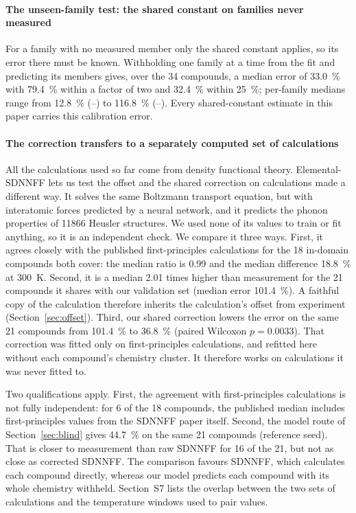 \paragraph{The unseen-family test: the shared constant on families never measured}
\label{sec:unseenfamily}
For a family with no measured member only the shared constant applies, so its error there must be
known. Withholding one family at a time from the fit and predicting its members gives, over the
\num{34} compounds, a median error of \SI{33.0}{\percent} with \SI{79.4}{\percent} within a factor
of two and \SI{32.4}{\percent} within \SI{25}{\percent}; per-family medians range from
\SI{12.8}{\percent} (--) to \SI{116.8}{\percent} (--). Every
shared-constant estimate in this paper carries this calibration error.

\paragraph{The correction transfers to a separately computed set of calculations}
\label{sec:sdnnff}

All the calculations used so far come from density functional theory. Elemental-SDNNFF
\cite{rodriguez2023millionsca} lets us test the offset and the shared correction on
calculations made a different way. It
solves the same Boltzmann transport equation, but with interatomic forces predicted by a neural
network, and it predicts the phonon properties of \num{11866} Heusler structures. We used none of its
values to train or fit anything, so it is an independent check. We compare it three ways. First, it
agrees closely with the published first-principles calculations for the \num{18} in-domain compounds
both cover: the median ratio is \num{0.99} and the median difference \SI{18.8}{\percent} at
\SI{300}{\kelvin}. Second, it is a median \num{2.01} times higher than measurement for the \num{21}
compounds it shares with our validation set (median error \SI{101.4}{\percent}). A faithful copy of
the calculation therefore inherits the calculation's offset from experiment
(Section~\ref{sec:offset}). Third, our shared correction lowers the error on the same \num{21}
compounds from \SI{101.4}{\percent} to \SI{36.8}{\percent} (paired Wilcoxon $p=\num{0.0033}$). That
correction was fitted only on first-principles calculations, and refitted here without each
compound's chemistry cluster. It therefore works on calculations it was never fitted to.

Two qualifications apply. First, the agreement with first-principles calculations is not fully
independent: for \num{6} of the \num{18} compounds, the published median includes first-principles
values from the SDNNFF paper itself. Second, the model route of Section~\ref{sec:blind} gives
\SI{44.7}{\percent} on the same \num{21} compounds (reference seed). That is closer to measurement
than raw SDNNFF for \num{16} of the \num{21}, but not as close as corrected SDNNFF. The comparison
favours SDNNFF, which calculates each compound directly, whereas our model predicts each compound
with its whole chemistry withheld. Section~S7 lists the overlap between the two sets of calculations
and the temperature windows used to pair values.

